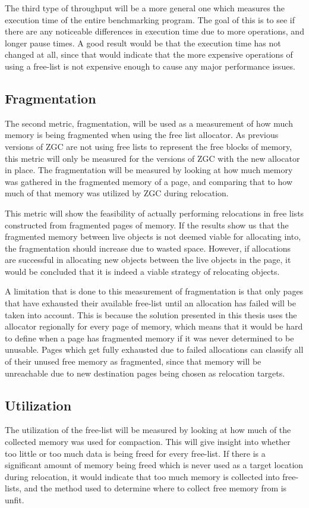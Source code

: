 The third type of throughput will be a more general one which measures the execution time of the entire benchmarking program. The goal of this is to see if there are any noticeable differences in execution time due to more operations, and longer pause times. A good result would be that the execution time has not changed at all, since that would indicate that the more expensive operations of using a free-list is not expensive enough to cause any major performance issues.

\subsection{Fragmentation}
The second metric, fragmentation, will be used as a measurement of how much memory is being fragmented when using the free list allocator. As previous versions of ZGC are not using free lists to represent the free blocks of memory, this metric will only be measured for the versions of ZGC with the new allocator in place. The fragmentation will be measured by looking at how much memory was gathered in the fragmented memory of a page, and comparing that to how much of that memory was utilized by ZGC during relocation.

This metric will show the feasibility of actually performing relocations in free lists constructed from fragmented pages of memory. If the results show us that the fragmented memory between live objects is not deemed viable for allocating into, the fragmentation should increase due to wasted space. However, if allocations are successful in allocating new objects between the live objects in the page, it would be concluded that it is indeed a viable strategy of relocating objects.

A limitation that is done to this measurement of fragmentation is that only pages that have exhausted their available free-list until an allocation has failed will be taken into account. This is because the solution presented in this thesis uses the allocator regionally for every page of memory, which means that it would be hard to define when a page has fragmented memory if it was never determined to be unusable. Pages which get fully exhausted due to failed allocations can classify all of their unused free memory as fragmented, since that memory will be unreachable due to new destination pages being chosen as relocation targets.

\subsection{Utilization}
The utilization of the free-list will be measured by looking at how much of the collected memory was used for compaction. This will give insight into whether too little or too much data is being freed for every free-list. If there is a significant amount of memory being freed which is never used as a target location during relocation, it would indicate that too much memory is collected into free-lists, and the method used to determine where to collect free memory from is unfit.

